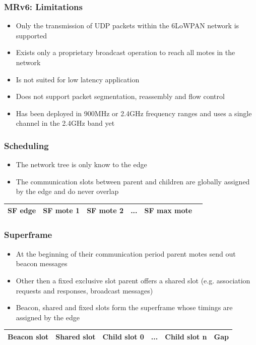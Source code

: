\begin{frame}[fragile]
  \frametitle{MRv6: Limitations}
  \begin{itemize}
    \item Only the transmission of UDP packets within the 6LoWPAN network is supported
    \item Exists only a proprietary broadcast operation to reach all motes in the network
    \item Is not suited for low latency application
    \item Does not support packet segmentation, reassembly and flow control
    \item Has been deployed in 900MHz or 2.4GHz frequency ranges and uses a single channel in the 2.4GHz band yet
  \end{itemize}
\end{frame}

\begin{frame}[fragile]
  \frametitle{Scheduling}
  \begin{itemize}
    \item The network tree is only know to the edge
    \item The communication slots between parent and children are globally assigned by the edge and do never overlap
    \end{itemize}
    \begin{table}[h]
      \begin{tabular}{@{}|c|c|l|l|l|l|@{}}
	\toprule
	 SF edge & SF mote 1 & SF mote 2 & ... & SF max mote \\ \bottomrule
      \end{tabular}
    \end{table}
\end{frame}

\begin{frame}[fragile]
  \frametitle{Superframe}
  \begin{itemize}
   \item At the beginning of their communication period parent motes send out beacon messages
    \item Other then a fixed exclusive slot parent offers a shared slot (e.g. association requests and responses, broadcast messages)
    \item Beacon, shared and fixed slots form the superframe whose timings are assigned by the edge
  \end{itemize}
  \begin{table}[h]
    \begin{tabular}{@{}|p{1.5cm}|p{1.5cm}|p{1.5cm}|p{1cm}|p{1.5cm}|p{1cm}|@{}}
      \toprule
      Beacon slot & Shared slot & Child slot 0 & ... & Child slot n & Gap \\ \bottomrule
    \end{tabular}
  \end{table}
\end{frame}

